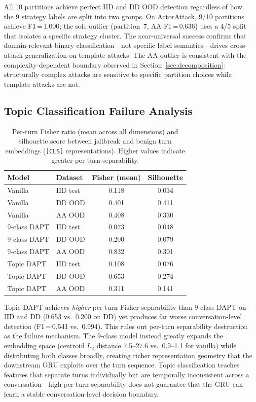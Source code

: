 All 10 partitions achieve perfect IID and DD OOD detection regardless of how the 9 strategy labels are split into two groups. On ActorAttack, 9/10 partitions achieve F1\,=\,1.000; the sole outlier (partition~7, AA F1\,=\,0.636) uses a 4/5 split that isolates a specific strategy cluster. The near-universal success confirms that domain-relevant binary classification---not specific label semantics---drives cross-attack generalization on template attacks. The AA outlier is consistent with the complexity-dependent boundary observed in Section~\ref{sec:decomposition}: structurally complex attacks are sensitive to specific partition choices while template attacks are not.

\subsection{Topic Classification Failure Analysis}

\begin{table}[ht]
\centering
\footnotesize
\caption{Per-turn Fisher ratio (mean across all dimensions) and silhouette score between jailbreak and benign turn embeddings (\texttt{[CLS]} representations). Higher values indicate greater per-turn separability.}
\label{tab:topic_failure}
\begin{tabular}{@{}llcc@{}}
\toprule
\textbf{Model} & \textbf{Dataset} & \textbf{Fisher (mean)} & \textbf{Silhouette} \\
\midrule
Vanilla  & IID test & 0.118 & 0.034 \\
Vanilla  & DD OOD  & 0.401 & 0.411 \\
Vanilla  & AA OOD  & 0.408 & 0.330 \\
\midrule
9-class DAPT & IID test & 0.073 & 0.048 \\
9-class DAPT & DD OOD  & 0.200 & 0.079 \\
9-class DAPT & AA OOD  & 0.832 & 0.301 \\
\midrule
Topic DAPT & IID test & 0.108 & 0.076 \\
Topic DAPT & DD OOD  & 0.653 & 0.274 \\
Topic DAPT & AA OOD  & 0.311 & 0.141 \\
\bottomrule
\end{tabular}
\end{table}

Topic DAPT achieves \emph{higher} per-turn Fisher separability than 9-class DAPT on IID and DD (0.653 vs.\ 0.200 on DD) yet produces far worse conversation-level detection (F1\,=\,0.541 vs.\ 0.994). This rules out per-turn separability destruction as the failure mechanism. The 9-class model instead greatly expands the embedding space (centroid $L_2$ distance 7.5--27.6 vs.\ 0.9--1.1 for vanilla) while distributing both classes broadly, creating richer representation geometry that the downstream GRU exploits over the turn sequence. Topic classification teaches features that separate turns individually but are temporally inconsistent across a conversation---high per-turn separability does not guarantee that the GRU can learn a stable conversation-level decision boundary.

